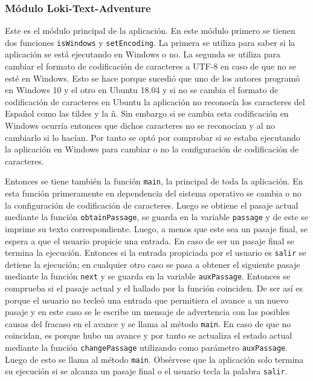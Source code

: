 \documentclass[12pt]{article}
\begin{document}
\subsubsection{Módulo Loki-Text-Adventure}

Este es el m\'odulo principal de la aplicaci\'on. En este m\'odulo primero se tienen dos funciones \verb|isWindows| y \verb|setEncoding|. La primera se utiliza para saber si la aplicaci\'on se est\'a ejecutando en Windows o no. La segunda se utiliza para cambiar el formato de codificaci\'on de caracteres a UTF-8 en caso de que no se esté en Windows. Esto se hace porque sucedió que uno de los autores program\'o en Windows 10 y el otro en Ubuntu 18.04 y si no se cambia el formato de codificaci\'on de caracteres en Ubuntu la aplicaci\'on no reconoc\'ia los caracteres del Español como las tildes y la ñ. Sin embargo si se cambia esta codificaci\'on en Windows ocurr\'ia entonces que dichos caracteres no se reconoc\'ian y al no cambiarlo si lo hac\'ian. Por tanto se opt\'o por comprobar si se estaba ejecutando la aplicaci\'on en Windows para cambiar o no la configuraci\'on de codificaci\'on de caracteres.

Entonces se tiene tambi\'en la funci\'on \verb|main|, la principal de toda la aplicaci\'on. En esta funci\'on primeramente en dependencia del sistema operativo se cambia o no la configuraci\'on de codificaci\'on de caracteres. Luego se obtiene el pasaje actual mediante la funci\'on \verb|obtainPassage|, se guarda en la variable \verb|passage| y de este se imprime su texto correspondiente. Luego, a menos que este sea un pasaje final, se espera a que el usuario propicie una entrada. En caso de ser un pasaje final se termina la ejecuci\'on. Entonces si la entrada propiciada por el usuario es \verb|salir| se detiene la ejecuci\'on; en cualquier otro caso se pasa a obtener el siguiente pasaje mediante la funci\'on \verb|next| y se guarda en la variable \verb|auxPassage|. Entonces se comprueba si el pasaje actual y el hallado por la funci\'on coinciden. De ser as\'i es porque el usuario no tecleó una entrada que permitiera el avance a un nuevo pasaje y en este caso se le escribe un mensaje de advertencia con las posibles causas del fracaso en el avance y se llama al m\'etodo \verb|main|. En caso de que no coincidan, es porque hubo un avance y por tanto se actualiza el estado actual mediante la funci\'on \verb|changePassage| utilizando como par\'ametro \verb|auxPassage|. Luego de esto se llama al m\'etodo \verb|main|. Obs\'ervese que la aplicaci\'on solo termina su ejecuci\'on si se alcanza un pasaje final o el usuario tecla la palabra \verb|salir|.   
\end{document}
